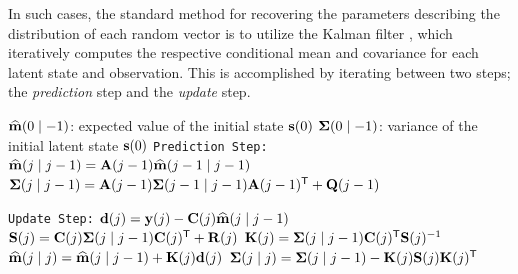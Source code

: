 \documentclass[10pt]{article}
\begin{document}
In such cases, the standard method for recovering the parameters describing the distribution of each random vector is to utilize the Kalman filter \citep{Kalman-Filter-1960}, which iteratively computes the respective conditional mean and covariance for each latent state and observation. This is accomplished by iterating between two steps; the \emph{prediction} step and the \emph{update} step.


\begin{algorithm}
    \caption{The Kalman Filter \citep{Kalman-Filter-1960}}
    \label{alg:kalman-filter}
    
    \begin{algorithmic}[1]
        \Require
            \Statex \hspace{\algorithmicindent} $\widehat{\mathbf{m}}(0 \mid -1)$: expected value of the initial state $\mathbf{s}(0)$       
            \Statex \hspace{\algorithmicindent} $\bm{\Sigma}(0 \mid -1)$: variance of the initial latent state $\mathbf{s}(0)$
            \Statex \texttt{Prediction Step:}
            \State $\widehat{\mathbf{m}}(j \mid j-1) = \mathbf{A}(j-1)\widehat{\mathbf{m}}(j-1 \mid j-1)$
            \State $\bm{\Sigma}(j \mid j-1) = \mathbf{A}(j-1)\bm{\Sigma}(j-1 \mid j-1)\mathbf{A}(j-1)^{\scriptstyle{\mathsf{T}}} + \mathbf{Q}(j-1)$

            \Statex \texttt{Update Step:}
            \State $\mathbf{d}(j) = \mathbf{y}(j) - \mathbf{C}(j)\widehat{\mathbf{m}}(j \mid j-1)$
            \State $\mathbf{S}(j) = \mathbf{C}(j)\bm{\Sigma}(j \mid j-1)\mathbf{C}(j)^{\scriptstyle{\mathsf{T}}} + \mathbf{R}(j)$
            \State $\mathbf{K}(j) = \bm{\Sigma}(j \mid j-1)\mathbf{C}(j)^{\scriptstyle{\mathsf{T}}}\mathbf{S}(j)^{-1}$ 
            \State $\widehat{\mathbf{m}}(j \mid j) = \widehat{\mathbf{m}}(j \mid j-1) + \mathbf{K}(j)\mathbf{d}(j)$
            \State $\bm{\Sigma}(j \mid j) = \bm{\Sigma}(j \mid j-1) - \mathbf{K}(j)\mathbf{S}(j)\mathbf{K}(j)^{\scriptstyle{\mathsf{T}}}$
        \EndFor
    \end{algorithmic}
\end{algorithm}
\end{document}
